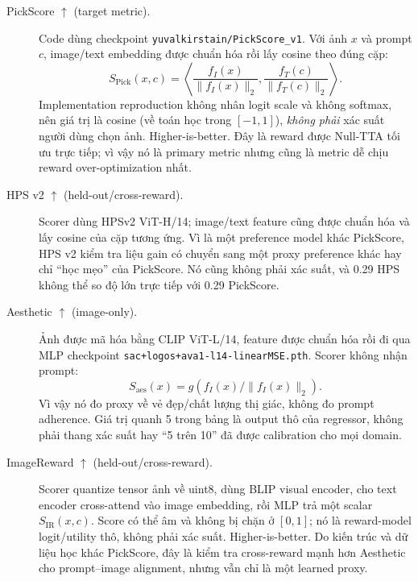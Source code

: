 \documentclass[11pt,a4paper]{article}
\newcommand{\code}[1]{\texttt{#1}}
\begin{document}
\begin{description}
  \item[PickScore $\uparrow$ (target metric).] Code dùng checkpoint \code{yuvalkirstain/PickScore\_v1}. Với ảnh $x$ và prompt $c$, image/text embedding được chuẩn hóa rồi lấy cosine theo đúng cặp:
  \begin{equation}
    S_{\mathrm{Pick}}(x,c)=
    \left\langle \frac{f_I(x)}{\lVert f_I(x)\rVert_2},
    \frac{f_T(c)}{\lVert f_T(c)\rVert_2}\right\rangle .
  \end{equation}
  Implementation reproduction không nhân logit scale và không softmax, nên giá trị là cosine (về toán học trong $[-1,1]$), \emph{không phải} xác suất người dùng chọn ảnh. Higher-is-better. Đây là reward được Null-TTA tối ưu trực tiếp; vì vậy nó là primary metric nhưng cũng là metric dễ chịu reward over-optimization nhất.

  \item[HPS v2 $\uparrow$ (held-out/cross-reward).] Scorer dùng HPSv2 ViT-H/14; image/text feature cũng được chuẩn hóa và lấy cosine của cặp tương ứng. Vì là một preference model khác PickScore, HPS v2 kiểm tra liệu gain có chuyển sang một proxy preference khác hay chỉ ``học mẹo'' của PickScore. Nó cũng không phải xác suất, và 0.29 HPS không thể so độ lớn trực tiếp với 0.29 PickScore.

  \item[Aesthetic $\uparrow$ (image-only).] Ảnh được mã hóa bằng CLIP ViT-L/14, feature được chuẩn hóa rồi đi qua MLP checkpoint \code{sac+logos+ava1-l14-linearMSE.pth}. Scorer không nhận prompt:
  \begin{equation}
    S_{\mathrm{aes}}(x)=g\!\left(f_I(x)/\lVert f_I(x)\rVert_2\right).
  \end{equation}
  Vì vậy nó đo proxy về vẻ đẹp/chất lượng thị giác, không đo prompt adherence. Giá trị quanh 5 trong bảng là output thô của regressor, không phải thang xác suất hay ``5 trên 10'' đã được calibration cho mọi domain.

  \item[ImageReward $\uparrow$ (held-out/cross-reward).] Scorer quantize tensor ảnh về uint8, dùng BLIP visual encoder, cho text encoder cross-attend vào image embedding, rồi MLP trả một scalar $S_{\mathrm{IR}}(x,c)$. Score có thể âm và không bị chặn ở $[0,1]$; nó là reward-model logit/utility thô, không phải xác suất. Higher-is-better. Do kiến trúc và dữ liệu học khác PickScore, đây là kiểm tra cross-reward mạnh hơn Aesthetic cho prompt--image alignment, nhưng vẫn chỉ là một learned proxy.
\end{description}
\end{document}
